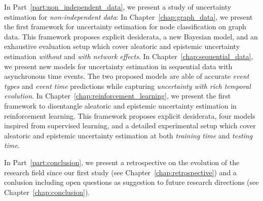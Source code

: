 In Part~\ref{part:non_independent_data}, we present a study of uncertainty estimation for \emph{non-independent data}:
In Chapter~\ref{chap:graph_data}, we present the first framework for uncertainty estimation for node classification on graph data. This framework proposes explicit desiderata, a new Bayesian model, and an exhaustive evaluation setup which cover aleatoric and epistemic uncertainty estimation \emph{without} and \emph{with network effects}.
In Chapter~\ref{chap:sequential_data}, we present new models for uncertainty estimation in sequential data with asynchronous time events. The two proposed models are able of accurate \emph{event types} and \emph{event time} predictions while capturing \emph{uncertainty with rich temporal evolution}.
In Chapter~\ref{chap:reinforcement_learning}, we present the first framework to disentangle aleatoric and epistemic uncertainty estimation in reinforcement learning. This framework proposes explicit desiderata, four models inspired from supervised learning, and a detailed experimental setup which cover aleatoric and epistemic uncertainty estimation at both \emph{training time} and \emph{testing time}.

In Part~\ref{part:conclusion}, we present a retrospective on the evolution of the research field since our first study (see Chapter~\ref{chap:retrospective}) and a conlusion including open questions as suggestion to future research directions (see Chapter~\ref{chap:conclusion}).

